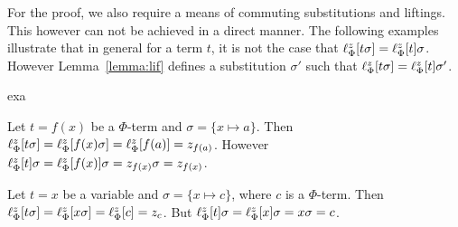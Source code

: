 For the proof, we also require a means of commuting substitutions and liftings.
This however can not be achieved in a direct manner. The following examples illustrate
that in general for a term $t$, it is not the case that
$
\ell_{\Phi}^{z}[t\sigma] =
\ell_{\Phi}^{z}[t]\sigma 
$. However Lemma~\ref{lemma:lif} defines a substitution $\sigma'$ such that 
$
\ell_{\Phi}^{z}[t\sigma] =
\ell_{\Phi}^{z}[t]\sigma'
$.

\begin{subtheorem}{exa}
	\begin{exa}
		Let $t = f(x)$ be a $\Phi$-term and $\sigma = \{x \mapsto a\}$.
		Then $\ell_{\Phi}^{z}[t\sigma] = \ell_{\Phi}^{z}[f(x)\sigma] = \ell_{\Phi}^{z}[f(a)] = z_{f(a)}$.
		However $\ell_{\Phi}^{z}[t]\sigma = \ell_{\Phi}^{z}[f(x)]\sigma = z_{f(x)}\sigma = z_{f(x)}$.
	\end{exa}
	\begin{exa}
		Let $t=x$ be a variable and $\sigma = \{x\mapsto c\}$, where $c$ is a $\Phi$-term.
		Then $\ell_{\Phi}^{z}[t\sigma] = 
		\ell_{\Phi}^{z}[x\sigma] =
		\ell_{\Phi}^{z}[c] = z_c$.
		But 
		$\ell_{\Phi}^{z}[t]\sigma = 
		\ell_{\Phi}^{z}[x]\sigma = 
		x\sigma = 
		c$.
	\end{exa}
\end{subtheorem}


